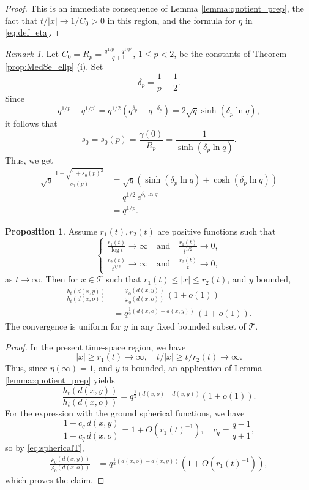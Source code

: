 \documentclass[10pt,a4paper]{amsart}
\renewcommand\mathcal{\mathscr}
\theoremstyle{plain}
\theoremstyle{remark}
\newtheorem{remark}[theorem]{Remark}
\theoremstyle{definition}
\newtheorem{proposition}[theorem]{Proposition}
\begin{document}
	\begin{proof}
    This is an immediate consequence of Lemma \ref{lemma:quotient_prep}, the fact that $t/|x|\to 1/C_0>0$ in this region, and the formula for $\eta$ in \eqref{eq:def_eta}.
	\end{proof}
	
	\begin{remark}\label{remark:q^{1/p}} Let $C_0=R_p=\frac{q^{1/p}-q^{1/p'}}{q+1}$, $1\leq p< 2$, be the constants of Theorem \ref{prop:MedSe_ellp} (i). Set
    $$
		\delta_p=\frac{1}{p}-\frac{1}{2}.
		$$
    Since $$q^{1 / p}-q^{1 / p^{\prime}}=q^{1 / 2}\left(q^{\delta_p}-q^{-\delta_p}\right) =2 \sqrt{q} \sinh (\delta_p \ln q),$$
   it follows that 
   \[
    s_0=s_0(p)=\frac{\gamma(0)}{R_p}= \frac{1}{\sinh (\delta_p\ln q)}.  \]
		Thus, we get
		\begin{align*}
			\sqrt{q}\, \frac{1+\sqrt{1+s_0(p)^2}}{s_0(p)}&=\sqrt{q}(\sinh (\delta_p \ln q)+\cosh (\delta_p \ln q))\\
			&=q^{1/2}\, e^{\delta_p \ln q}\\
			&=q^{1/p}.
		\end{align*}
	\end{remark}

    
	\begin{proposition}\label{prop:ratio_asym_L2}
		Assume $r_1(t), r_2(t)$ are positive functions such that \[
        \begin{cases}
        \frac{r_1(t)}{\log t}\to \infty \quad \text{and} \, &\frac{r_1(t)}{t^{1 / 2}} \to 0, \\
        \frac{r_2(t)}{t^{1/2}} \to \infty \quad \text{and} \, &\frac{r_2(t)}{t}\to 0,
        \end{cases}
        \]
        as $t \to\infty$. 
        Then for $x\in \mathcal{T}$ such that $r_1(t)\leq|x|\leq r_2(t)$, and $y$ bounded,
		\begin{align*}
			\frac{h_t(d(x,y))}{h_t(d(x,o))}&= \frac{\varphi_0(d(x,y))}{\varphi_0(d(x,o))}\, (1+o(1))\\
			&=q^{\frac{1}{2}(d(x,o)-d(x,y))}\, (1+o(1)).	
            \end{align*}
		The convergence is uniform for $y$ in any fixed bounded subset of $\mathcal T$.
	\end{proposition}
    
	\begin{proof}
    In the present time-space region, we have $$|x|\geq r_1(t)\to \infty, \quad  t/|x|\geq t/r_2(t)\to \infty.$$ Thus, since $\eta(\infty)=1$, and $y$ is bounded, an application of Lemma \ref{lemma:quotient_prep} yields
    \[
    \frac{h_t(d(x,y))}{h_t(d(x,o))}=q^{\frac{1}{2}(d(x,o)-d(x,y))}(1+o(1)).
    \]
		For the expression with the ground spherical functions, we have
		\[
		\frac{1+c_q\,d(x,y)}{1+c_q\,d(x,o)}= 1+O(r_1(t)^{-1}), \quad c_q=\frac{q-1}{q+1},
		\]
		so by \eqref{eq:sphericalT},
	        \begin{align*}
			\frac{\varphi_0(d(x,y))}{\varphi_0(d(x,o))}
			&= q^{\frac{1}{2}(d(x,o)-d(x,y))}(1+O(r_1(t)^{-1})),
            \end{align*}
	which proves the claim.
	\end{proof}
	
\end{document}
